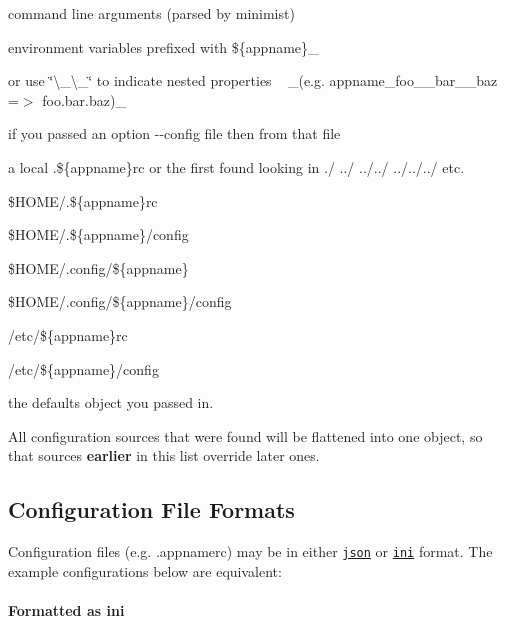 \begin{DoxyItemize}
\item command line arguments (parsed by minimist)
\item environment variables prefixed with {\ttfamily \$\{appname\}\+\_\+}
\begin{DoxyItemize}
\item or use \char`\"{}\textbackslash{}\+\_\+\textbackslash{}\+\_\+\char`\"{} to indicate nested properties ~\newline
 \+\_\+(e.\+g. {\ttfamily appname\+\_\+foo\+\_\+\+\_\+bar\+\_\+\+\_\+baz} =$>$ {\ttfamily foo.\+bar.\+baz})\+\_\+
\end{DoxyItemize}
\item if you passed an option {\ttfamily -\/-\/config file} then from that file
\item a local {\ttfamily .\$\{appname\}rc} or the first found looking in {\ttfamily ./ ../ ../../ ../../../} etc.
\item {\ttfamily \$\+H\+O\+ME/.\$\{appname\}rc}
\item {\ttfamily \$\+H\+O\+ME/.\$\{appname\}/config}
\item {\ttfamily \$\+H\+O\+ME/.config/\$\{appname\}}
\item {\ttfamily \$\+H\+O\+ME/.config/\$\{appname\}/config}
\item {\ttfamily /etc/\$\{appname\}rc}
\item {\ttfamily /etc/\$\{appname\}/config}
\item the defaults object you passed in.
\end{DoxyItemize}

All configuration sources that were found will be flattened into one object, so that sources {\bfseries earlier} in this list override later ones.

\subsection*{Configuration File Formats}

Configuration files (e.\+g. {\ttfamily .appnamerc}) may be in either \href{http://json.org/example}{\tt json} or \href{http://en.wikipedia.org/wiki/INI_file}{\tt ini} format. The example configurations below are equivalent\+:

\paragraph*{Formatted as {\ttfamily ini}}



